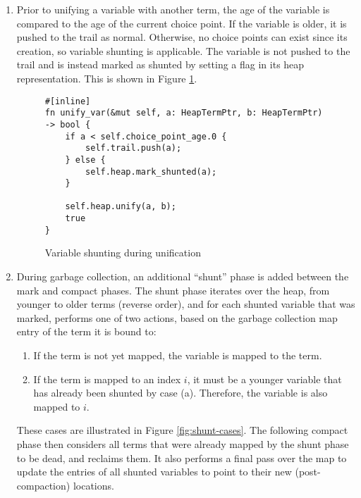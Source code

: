 \begin{enumerate}
\item Prior to unifying a variable with another term, the age of the variable is compared to the age of the current choice point. If the variable is older, it is pushed to the trail as normal. Otherwise, no choice points can exist since its creation, so variable shunting is applicable. The variable is not pushed to the trail and is instead marked as shunted by setting a flag in its heap representation. This is shown in Figure \ref{fig:unify-var}.

\begin{figure}[H]
\centering
\begin{verbatim}
#[inline]
fn unify_var(&mut self, a: HeapTermPtr, b: HeapTermPtr) -> bool {
    if a < self.choice_point_age.0 {
        self.trail.push(a);
    } else {
        self.heap.mark_shunted(a);
    }

    self.heap.unify(a, b);
    true
}
\end{verbatim}
\caption{Variable shunting during unification}
\label{fig:unify-var}
\end{figure}

\item During garbage collection, an additional ``shunt'' phase is added between the mark and compact phases. The shunt phase iterates over the heap, from younger to older terms (reverse order), and for each shunted variable that was marked, performs one of two actions, based on the garbage collection map entry of the term it is bound to:
\begin{enumerate}
\item If the term is not yet mapped, the variable is mapped to the term.
\item If the term is mapped to an index $i$, it must be a younger variable that has already been shunted by case (a). Therefore, the variable is also mapped to $i$.
\end{enumerate}

These cases are illustrated in Figure \ref{fig:shunt-cases}. The following compact phase then considers all terms that were already mapped by the shunt phase to be dead, and reclaims them. It also performs a final pass over the map to update the entries of all shunted variables to point to their new (post-compaction) locations.

\begin{figure}[H]
\centering
{}
\end{figure}
\end{enumerate}
